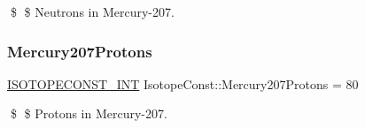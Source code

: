 \$ \$ Neutrons in Mercury-\/207. \mbox{\label{group___isotope_const-_mercury-_hg207_ga894fd60523f5ffa7ea5ef37394463d82}} 
\subsubsection{\texorpdfstring{Mercury207\+Protons}{Mercury207Protons}}
{\footnotesize\ttfamily \mbox{\hyperlink{group___isotope_const-_macros_ga5f18360b3e99483a35c32d789e62621c}{I\+S\+O\+T\+O\+P\+E\+C\+O\+N\+S\+T\+\_\+\+I\+NT}} Isotope\+Const\+::\+Mercury207\+Protons = 80}

\$ \$ Protons in Mercury-\/207. 